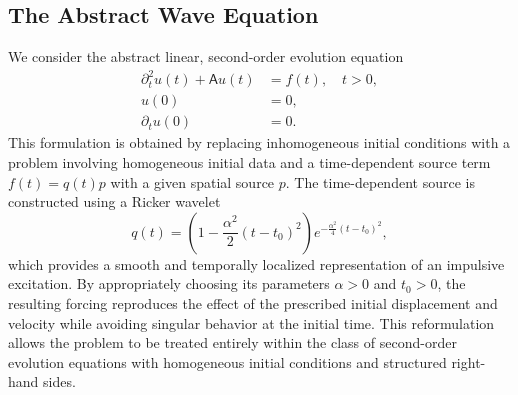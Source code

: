 \subsection{The Abstract Wave Equation}\label{sec:abstract_wave}
We consider the abstract linear, second-order evolution equation
\begin{align}
    \partial_t^2 u(t) + \mathsf{A} u(t) &= f(t), \quad t>0, \label{eq:wave}\\
    u(0) &= 0, \label{eq:ic1}\\
    \partial_t u(0) &= 0. \label{eq:ic2}
\end{align}
This formulation is obtained by replacing inhomogeneous initial conditions with a  problem involving homogeneous initial data and a time-dependent source term $f(t)=q(t)p$ with a given spatial source $p$. The time-dependent source is constructed using a Ricker wavelet
\begin{equation}\label{eq:ricker_wavelet}
     q(t)
     =
     \left(
        1-\frac{\alpha^2}{2}(t-t_0)^2
     \right)
     e^{
        - \frac{\alpha^2}{4}(t-t_0)^2
     },
\end{equation}
which provides a smooth and temporally localized representation of an impulsive excitation. By appropriately choosing its parameters $\alpha>0$ and $t_0>0$, the resulting forcing reproduces the effect of the prescribed initial displacement and velocity while avoiding singular behavior at the initial time. 
This reformulation allows the problem to be treated entirely within the class of second-order evolution equations with homogeneous initial conditions and structured right-hand sides.



